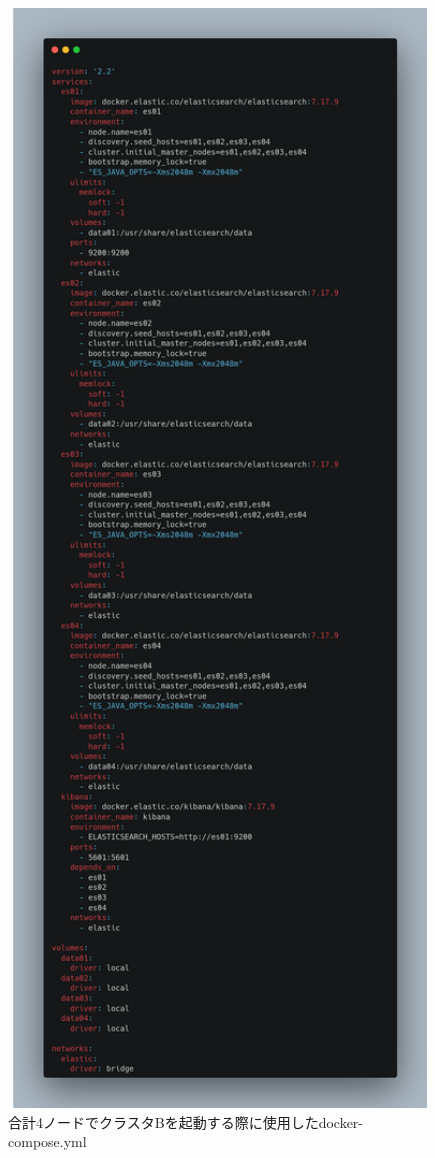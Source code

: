 \documentclass[a4j,12pt,]{jarticle}
\begin{document}
\begin{figure}[H]
\begin{center}
    \includegraphics[width=160mm]{4nodes.png}
    \caption{合計4ノードでクラスタBを起動する際に使用したdocker-compose.yml}
    \label{p3}
  \end{center}
\end{figure}
\end{document}
